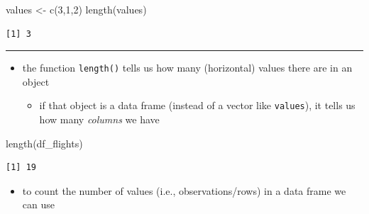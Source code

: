 \documentclass[
  letterpaper,
  DIV=11]{scrartcl}
\newenvironment{Shaded}{\begin{snugshade}}{\end{snugshade}}
\newcommand{\DecValTok}[1]{\textcolor[rgb]{0.68,0.00,0.00}{#1}}
\newcommand{\FunctionTok}[1]{\textcolor[rgb]{0.28,0.35,0.67}{#1}}
\newcommand{\NormalTok}[1]{\textcolor[rgb]{0.00,0.23,0.31}{#1}}
\newcommand{\OtherTok}[1]{\textcolor[rgb]{0.00,0.23,0.31}{#1}}
\providecommand{\tightlist}{%
  \setlength{\itemsep}{0pt}\setlength{\parskip}{0pt}}\usepackage{longtable,booktabs,array}
\begin{document}
\begin{Shaded}
\begin{Highlighting}[]
\NormalTok{values }\OtherTok{\textless{}{-}} \FunctionTok{c}\NormalTok{(}\DecValTok{3}\NormalTok{,}\DecValTok{1}\NormalTok{,}\DecValTok{2}\NormalTok{)}
\FunctionTok{length}\NormalTok{(values)}
\end{Highlighting}
\end{Shaded}

\begin{verbatim}
[1] 3
\end{verbatim}

\begin{center}\rule{0.5\linewidth}{0.5pt}\end{center}

\begin{tcolorbox}[enhanced jigsaw, left=2mm, breakable, colframe=quarto-callout-note-color-frame, toprule=.15mm, toptitle=1mm, titlerule=0mm, leftrule=.75mm, title=\textcolor{quarto-callout-note-color}{\faInfo}\hspace{0.5em}{\texttt{length()} versus \texttt{nrow()} and \texttt{n()}}, colbacktitle=quarto-callout-note-color!10!white, colback=white, coltitle=black, arc=.35mm, bottomtitle=1mm, opacityback=0, rightrule=.15mm, bottomrule=.15mm, opacitybacktitle=0.6]

\begin{itemize}
\tightlist
\item
  the function \texttt{length()} tells us how many (horizontal) values
  there are in an object

  \begin{itemize}
  \tightlist
  \item
    if that object is a data frame (instead of a vector like
    \texttt{values}), it tells us how many \emph{columns} we have
  \end{itemize}
\end{itemize}

\begin{Shaded}
\begin{Highlighting}[]
\FunctionTok{length}\NormalTok{(df\_flights)}
\end{Highlighting}
\end{Shaded}

\begin{verbatim}
[1] 19
\end{verbatim}

\begin{itemize}
\tightlist
\item
  to count the number of values (i.e., observations/rows) in a data
  frame we can use


\end{itemize}
\end{tcolorbox}
\end{document}
